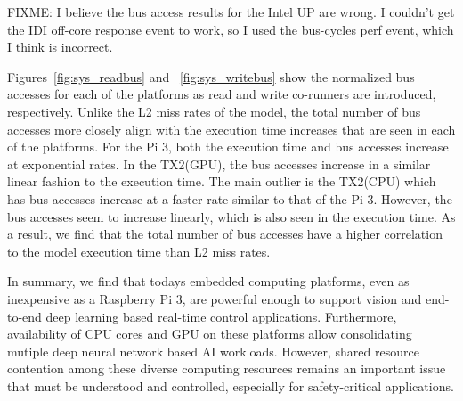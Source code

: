 \color{red}FIXME: I believe the bus access results for the Intel UP are wrong. 
I couldn't get the IDI off-core response event to work, so I used the bus-cycles 
perf event, which I think is incorrect.

\color{black}Figures~\ref{fig:sys_readbus} and ~\ref{fig:sys_writebus} show the
normalized bus accesses for each of the platforms as read and write
co-runners are introduced, respectively. Unlike the L2 miss rates of the
model, the total number of bus accesses more closely align with the 
execution time increases that are seen in each of the platforms. For the Pi 3, both 
the execution time and bus accesses increase at exponential rates. In the TX2(GPU), 
the bus accesses increase in a similar linear fashion to the execution time. The main outlier
is the TX2(CPU) which has bus accesses increase at a faster rate similar to that of the Pi 3.
However, the bus accesses seem to increase linearly, which is also seen in the
execution time. As a result, we find that the total number of bus accesses have a higher 
correlation to the model execution time than L2 miss rates.



In summary, we find that todays embedded computing platforms, even as
inexpensive as a Raspberry Pi 3, are powerful enough to support
vision and end-to-end deep learning based real-time control
applications. Furthermore, availability of CPU cores and GPU on these
platforms allow consolidating mutiple deep neural network based AI
workloads. However, shared resource contention among these diverse
computing resources remains an important issue that must be understood
and controlled, especially for safety-critical applications.
